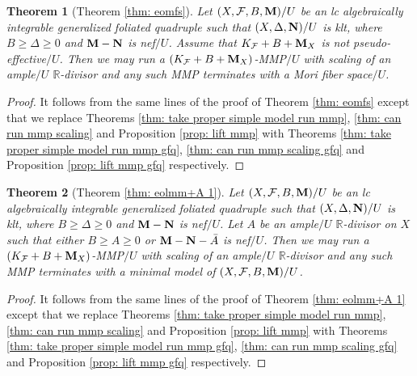 \documentclass[11pt]{amsart}
\numberwithin{equation}{section}
\newcommand{\Mm}{{\bf{M}}}
\newcommand{\Nn}{{\bf{N}}}
\newcommand{\Rr}{\mathbb{R}}
\newcommand{\Ff}{\mathcal{F}}
\newtheorem{thm}{Theorem}[section]
\theoremstyle{definition}
\theoremstyle{definition}
\theoremstyle{definition}
\begin{document}
\begin{thm}[Theorem \ref{thm: eomfs}]\label{thm: eomfs gfq}
Let $(X,\Ff,B,\Mm)/U$ be an lc algebraically integrable generalized foliated quadruple such that $(X,\Delta,\Nn)/U$ is klt, where $B\geq\Delta\geq 0$ and $\Mm-\Nn$ is nef$/U$. Assume that $K_{\Ff}+B+\Mm_X$ is not pseudo-effective$/U$. Then we may run a $(K_{\Ff}+B+\Mm_X)$-MMP$/U$ with scaling of an ample$/U$ $\Rr$-divisor and any such MMP terminates with a Mori fiber space$/U$.
\end{thm}
\begin{proof}
    It follows from the same lines of the proof of Theorem \ref{thm: eomfs} except that we replace Theorems \ref{thm: take proper simple model run mmp}, \ref{thm: can run mmp scaling} and Proposition \ref{prop: lift mmp} with Theorems \ref{thm: take proper simple model run mmp gfq}, \ref{thm: can run mmp scaling gfq} and Proposition \ref{prop: lift mmp gfq} respectively.
\end{proof}


\begin{thm}[Theorem \ref{thm: eolmm+A 1}]\label{thm: eolmm+A 1 gfq} 
Let $(X,\Ff,B,\Mm)/U$ be an lc algebraically integrable generalized foliated quadruple such that $(X,\Delta,\Nn)/U$ is klt, where $B\geq\Delta\geq 0$ and $\Mm-\Nn$ is nef$/U$. Let $A$ be an ample$/U$ $\Rr$-divisor on $X$ such that either $B\geq A\geq 0$ or $\Mm-\Nn-\bar A$ is nef$/U$. Then we may run a $(K_{\Ff}+B+\Mm_X)$-MMP$/U$ with scaling of an ample$/U$ $\Rr$-divisor and any such MMP terminates with a minimal model of $(X,\Ff,B,\Mm)/U$.
\end{thm}
\begin{proof}
    It follows from the same lines of the proof of Theorem \ref{thm: eolmm+A 1} except that we replace Theorems \ref{thm: take proper simple model run mmp}, \ref{thm: can run mmp scaling} and Proposition \ref{prop: lift mmp} with Theorems \ref{thm: take proper simple model run mmp gfq}, \ref{thm: can run mmp scaling gfq} and Proposition \ref{prop: lift mmp gfq} respectively.
\end{proof}
\end{document}
